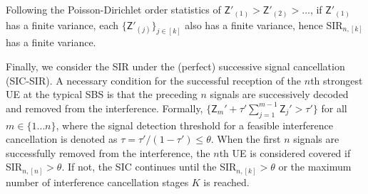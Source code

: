 \documentclass[lettersize,journal]{IEEEtran}
\begin{document}
Following the Poisson-Dirichlet order statistics of $\mathsf{Z}'_{(1)} > \mathsf{Z}'_{(2)} >\dots $, if $\mathsf{Z}'_{(1)}$ has a finite variance, each $\{\mathsf{Z}'_{(j)}\}_{j \in [k]}$ also has a finite variance, hence SIR$_{n,[k]}$ has a finite variance.



Finally, we consider the SIR under the (perfect) successive signal cancellation (SIC-SIR). A necessary condition for the successful reception of the $n$th strongest UE at the typical SBS is that the preceding $n$ signals are successively decoded and removed from the interference. Formally, $\{\mathsf{Z}_m'+\tau'\sum_{j=1}^{m-1}\mathsf{Z}_j'>\tau'\}$ for all $m \in \{1 \dots n\}$, where the signal detection threshold for a feasible interference cancellation is denoted as $ \tau = \tau'/(1-\tau') \leq \theta$. When the first $n$ signals are successfully removed from the interference, the $n$th UE is considered covered if SIR$_{n,[n]}>\theta$. If not, the SIC continues until the SIR$_{n,[k]}>\theta$ or the maximum number of interference cancellation stages $K$ is reached. %
\end{document}
